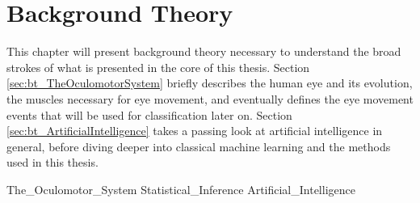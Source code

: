 \chapter{Background Theory} \label{ch:bt}

This chapter will present background theory necessary to understand the broad strokes of what is presented in the core of this thesis. Section \ref{sec:bt_TheOculomotorSystem} briefly describes the human eye and its evolution, the muscles necessary for eye movement, and eventually defines the eye movement events that will be used for classification later on. Section \ref{sec:bt_ArtificialIntelligence} takes a passing look at artificial intelligence in general, before diving deeper into classical machine learning and the methods used in this thesis.

{The_Oculomotor_System}
{Statistical_Inference}
{Artificial_Intelligence}